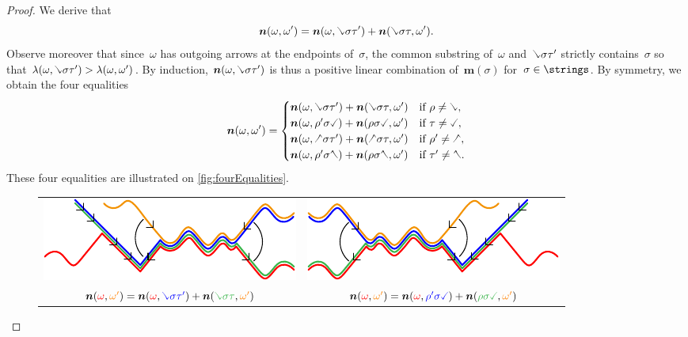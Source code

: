 \documentclass{amsart}
\theoremstyle{definition}
\renewcommand{\b}[1]{{\boldsymbol{#1}}} %
\newcommand{\red}{\color{red}} %
\newcommand{\blue}{\color{blue}} %
\newcommand{\orange}{\color{orange}} %
\newcommand{\green}{\color{green}} %
\newcommand{\hL}{\text{\rotatebox[origin=c]{180}{\checked}}}
\newcommand{\hR}{\text{\rotatebox[origin=c]{180}{\reflectbox{\checked}}}}
\newcommand{\cL}{\text{\reflectbox{\checked}}}
\newcommand{\cR}{\text{\checked}}
\begin{document}
\begin{proof}
We derive that
\[
\b{n}(\omega, \omega') = \b{n}(\omega, \cL \sigma \tau') + \b{n}(\cL \sigma \tau, \omega').
\]
Observe moreover that since~$\omega$ has outgoing arrows at the endpoints of~$\sigma$, the common substring of~$\omega$ and~$\cL \sigma \tau'$ strictly contains~$\sigma$ so that $\lambda(\omega, \cL \sigma \tau') > \lambda(\omega, \omega')$.
By induction, $\b{n}(\omega, \cL \sigma \tau')$ is thus a positive linear combination of~$\b{m}(\sigma)$ for~$\sigma \in \strings$.
%
By symmetry, we obtain the four equalities
\[
\b{n}(\omega, \omega') = 
\begin{cases}
\b{n}(\omega, \cL \sigma \tau') + \b{n}(\cL \sigma \tau, \omega') & \text{if } \rho \ne \cL, \\
\b{n}(\omega, \rho' \sigma \cR) + \b{n}(\rho \sigma \cR, \omega') & \text{if } \tau \ne \cR, \\
\b{n}(\omega, \hL \sigma \tau') + \b{n}(\hL \sigma \tau, \omega') & \text{if } \rho' \ne \hL, \\
\b{n}(\omega, \rho' \sigma \hR) + \b{n}(\rho \sigma \hR, \omega') & \text{if } \tau' \ne \hR.
\end{cases}
\]
These four equalities are illustrated on \cref{fig:fourEqualities}.
%
\begin{figure}[t]
	\capstart
	\begin{adjustbox}{center}
    	\begin{tabular}{c@{\qquad}c}
    		\includegraphics[scale=1.2]{fourEqualities1} & \includegraphics[scale=1.2]{fourEqualities2} \\
    		$\b{n}({\red \omega}, {\orange \omega'}) = \b{n}({\red \omega}, {\blue \cL \sigma \tau'}) + \b{n}({\green \cL \sigma \tau}, {\orange \omega'})$ & $\b{n}({\red \omega}, {\orange \omega'}) = \b{n}({\red \omega}, {\blue \rho' \sigma \cR}) + \b{n}({\green \rho \sigma \cR}, {\orange \omega'})$ \\[.4cm]

\end{tabular}
\end{adjustbox}
\end{figure}
\end{proof}
\end{document}
